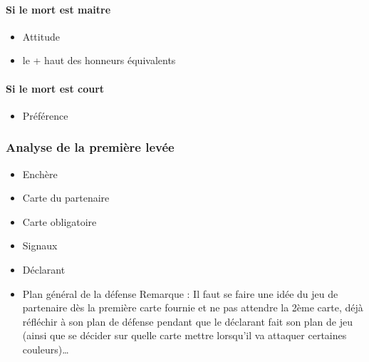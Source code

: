 \documentclass[a4paper]{article}
\begin{document}
\paragraph{Si le mort est maitre}

\begin{itemize}
\item Attitude

\item le + haut des honneurs équivalents

\end{itemize}

\paragraph{Si le mort est court}

\begin{itemize}
\item Préférence

\end{itemize}

\subsubsection{Analyse de la première levée}

\begin{itemize}
\item Enchère

\item Carte du partenaire

\item Carte obligatoire

\item Signaux

\item Déclarant

\item Plan général de la défense
Remarque : Il faut se faire une idée du jeu de partenaire dès la première carte fournie et ne pas attendre la 2ème carte, déjà réfléchir à son plan de défense pendant que le déclarant fait son plan de jeu (ainsi que se décider sur quelle carte mettre lorsqu’il va attaquer certaines couleurs)…


\end{itemize}
\end{document}
